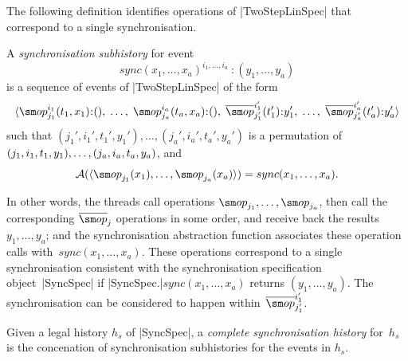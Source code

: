 The following definition identifies  operations of |TwoStepLinSpec| that
correspond to a single synchronisation.
%
\begin{definition}
A \emph{synchronisation subhistory} for event
\[
sync(x_1,\ldots,x_a)^{i_1,\ldots,i_a}\::(y_1,\ldots,y_a)
\]
is a sequence of events of |TwoStepLinSpec| of the form
\[
\seq{ \op^{i_1}_{j_1}(t_1, x_1)\::(),\; \ldots,\; 
  \op^{i_a}_{j_a}(t_a, x_a)\::(),\;
  \overline{\op}^{i_1'}_{j_1'}(t_1')\::y_1',\; \ldots,\; 
    \overline\op^{i_a'}_{j_a'}(t_a')\::y_a' }
\]
such that $(j_1',i_1',t_1',y_1'),\ldots,(j_a',i_a',t_a',y_a')$ is a
permutation of $(j_1,i_1,t_1,y_1),\linebreak[1] \ldots,\linebreak[1]
(j_a,i_a,t_a,y_a)$, and
\[
\A(\seq{\op_{j_1}(x_1), \ldots, \op_{j_a}(x_a)}) = sync(x_1,\ldots,x_a).
\]
\end{definition}
%
In other words, the threads call operations $\op_{j_1},\ldots,\op_{j_a}$, then
call the corresponding $\overline\op_j$ operations in some order, and receive
back the results $y_1,\ldots,y_a$; and the synchronisation abstraction
function associates these operation calls with~$sync(x_1,\ldots,x_a)$.  These
operations correspond to a single synchronisation consistent with
the synchronisation specification object~|SyncSpec| if
|SyncSpec.|$sync(x_1,\ldots,x_a)$ returns $(y_1,\ldots,y_a)$.  The
synchronisation can be considered to happen within~$\overline\op^{i_1'}_{j_1'}$.


%
\begin{definition}
Given a legal history $h_s$
of |SyncSpec|, a \emph{complete synchronisation history} for~$h_s$ is the
concenation of synchronisation subhistories for the events in $h_s$.
\end{definition}
%

